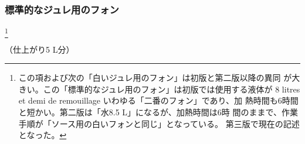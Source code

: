\vspace*{1\zw}
\begin{recette}
\hypertarget{fonds-pour-gelee-ordinaire}{%
\subsubsection{標準的なジュレ用のフォン}\label{fonds-pour-gelee-ordinaire}}

\footnote{この項および次の「白いジュレ用のフォン」は初版と第二版以降の異同
  が大きい。この「標準的なジュレ用のフォン」は初版では使用する液体が 8
  litres et demi de remouillage いわゆる「二番のフォン」であり、加
  熱時間も6時間と短かい。第二版は「水8.5 L」になるが、加熱時間は6時
  間のままで、作業手順が「ソース用の白いフォンと同じ」となっている。
  第三版で現在の記述となった。}


（仕上がり5 L分）


\end{recette}
